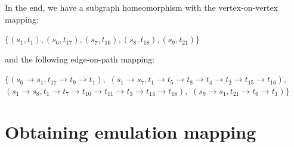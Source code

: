 In the end, we have a subgraph homeomorphism with the vertex-on-vertex mapping:

$\{(s_1, t_1), (s_6, t_{17}), (s_7, t_{16}), (s_8, t_{18}), (s_9, t_{21})\}$

and the following edge-on-path mapping:


$\{(s_6\to s_1, t_{17} \to t_9 \to t_1),$ \newline
$(s_1\to s_7,t_1 \to t_5 \to t_8 \to t_4 \to t_2 \to t_{15} \to t_{16}),$\newline
$(s_1\to s_8,t_1 \to t_7 \to t_{10} \to t_{11} \to t_3 \to t_{14} \to t_{18}),$\newline
$(s_9 \to s_1, t_{21} \to t_6 \to t_1)\}$

\section{Obtaining emulation mapping}
\label{sec:example-obtainingemulation}

